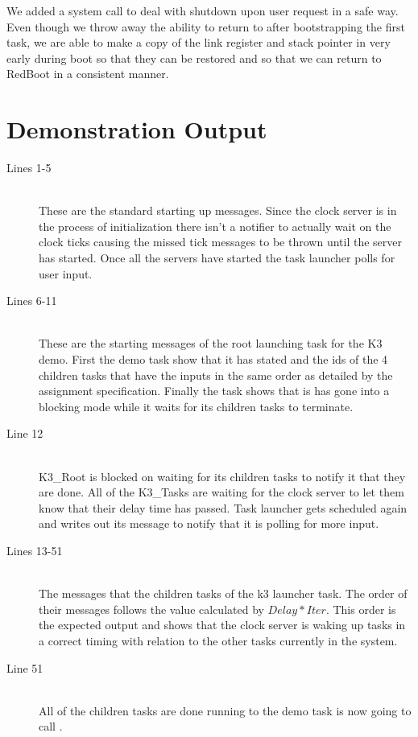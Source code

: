 \documentclass[pdftex,10pt,a4paper]{article}
\begin{document}
We added a  system call to deal with shutdown upon
user request in a safe way. Even though we throw away the ability to
return to  after bootstrapping the first task, we are able
to make a copy of the link register and stack pointer in 
very early during boot so that they can be restored and so that we can
return to RedBoot in a consistent manner.

\newpage
\section*{Demonstration Output}


\newpage
\begin{description}
\item[Lines 1-5] \hfill \\
These are the standard starting up messages. Since the clock server is
in the process of initialization there isn't a notifier to actually
wait on the clock ticks causing the missed tick messages to be thrown
until the server has started. Once all the servers have started the
task launcher polls for user input.

\item[Lines 6-11] \hfill \\
These are the starting messages of the root launching task for the K3
demo. First the demo task show that it has stated and the ids of the 4
children tasks that have the inputs in the same order as detailed by
the assignment specification. Finally the task shows that is has gone
into a blocking mode while it waits for its children tasks to
terminate.

\item[Line 12] \hfill \\
K3\_Root is blocked on waiting for its children tasks to notify it
that they are done. All of the K3\_Tasks are waiting for the clock
server to let them know that their delay time has passed. Task
launcher gets scheduled again and writes out its message to notify
that it is polling for more input.

\item[Lines 13-51] \hfill \\
The messages that the children tasks of the k3 launcher task. The
order of their messages follows the value calculated by
$Delay * Iter$. This order is the expected output and shows that the clock
server is waking up tasks in a correct timing with relation to the
other tasks currently in the system.

\item[Line 51] \hfill \\
All of the children tasks are done running to the demo task is now
going to call .

\end{description}
\end{document}
